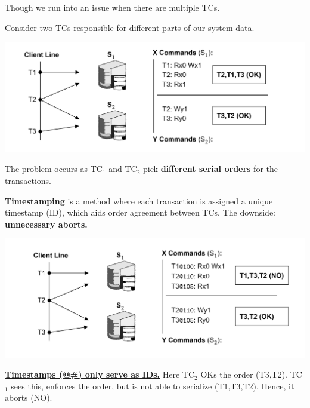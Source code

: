     \newpage

    \noindent
    Though we run into an issue when there are multiple TCs.
    \begin{Example}

        Consider two TCs responsible for different parts of our system data.

        \noindent
        \includegraphics[width=\textwidth]{Sections/trans/central_3.png}

        \noindent
        The problem occurs as TC$_1$ and TC$_2$ pick \textbf{different serial orders} for the transactions.
    \end{Example}
    
\begin{theo}

    \textbf{Timestamping} is a method where each transaction is assigned a unique timestamp (ID), which aids
    order agreement between TCs. The downside: \textbf{unnecessary aborts.}
\end{theo}

\begin{Example}

    \vspace{-1em}
    \noindent
    \includegraphics[width=\textwidth]{Sections/trans/central_4.png}

    \noindent
    \underline{\textbf{Timestamps (@\#) only serve as IDs.}} Here TC$_2$ OKs the order (T3,T2). TC$_1$ sees this,
    enforces the order, but is not able to serialize (T1,T3,T2). Hence, it aborts (NO).
    \end{Example}

